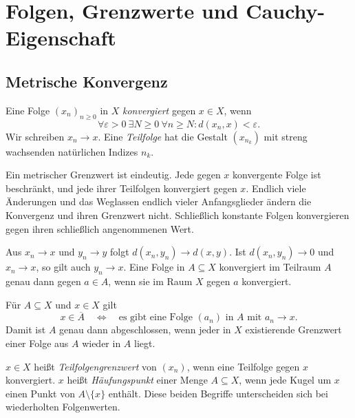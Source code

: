 \chapter{Folgen, Grenzwerte und Cauchy-Eigenschaft}
\label{b47guide:ch:sequences}

\section{Metrische Konvergenz}

\begin{definition}
Eine Folge $(x_n)_{n\geq0}$ in $X$ \emph{konvergiert} gegen $x\in X$, wenn
\[
 \forall\varepsilon>0\ \exists N\geq0\ \forall n\geq N:
 d(x_n,x)<\varepsilon.
\]
Wir schreiben $x_n\to x$. Eine \emph{Teilfolge} hat die Gestalt $(x_{n_k})$
mit streng wachsenden natürlichen Indizes $n_k$.
\end{definition}

\begin{theorem}
Ein metrischer Grenzwert ist eindeutig. Jede gegen $x$ konvergente Folge
ist beschränkt, und jede ihrer Teilfolgen konvergiert gegen $x$.
Endlich viele Änderungen und das Weglassen endlich vieler Anfangsglieder
ändern die Konvergenz und ihren Grenzwert nicht. Schließlich konstante
Folgen konvergieren gegen ihren schließlich angenommenen Wert.
\end{theorem}

\begin{theorem}
Aus $x_n\to x$ und $y_n\to y$ folgt $d(x_n,y_n)\to d(x,y)$.
Ist $d(x_n,y_n)\to0$ und $x_n\to x$, so gilt auch $y_n\to x$.
Eine Folge in $A\subseteq X$ konvergiert im Teilraum $A$ genau dann gegen
$a\in A$, wenn sie im Raum $X$ gegen $a$ konvergiert.
\end{theorem}

\begin{theorem}
\label{b47guide:thm:sequential-closure}
Für $A\subseteq X$ und $x\in X$ gilt
\[
 x\in\overline A
 \quad\Longleftrightarrow\quad
 \text{es gibt eine Folge $(a_n)$ in $A$ mit $a_n\to x$.}
\]
Damit ist $A$ genau dann abgeschlossen, wenn jeder in $X$ existierende
Grenzwert einer Folge aus $A$ wieder in $A$ liegt.
\end{theorem}

\begin{definition}
$x\in X$ heißt \emph{Teilfolgengrenzwert} von $(x_n)$, wenn eine Teilfolge
gegen $x$ konvergiert. $x$ heißt \emph{Häufungspunkt} einer Menge
$A\subseteq X$, wenn jede Kugel um $x$ einen Punkt von $A\setminus\{x\}$
enthält. Diese beiden Begriffe unterscheiden sich bei wiederholten
Folgenwerten.
\end{definition}


